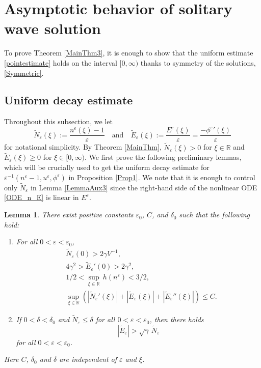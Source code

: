 \documentclass{amsart}
\newcommand{\veps}{\varepsilon}
\numberwithin{equation}{section}
\theoremstyle{plain}%
\newtheorem{lemma}[theorem]{Lemma}
\theoremstyle{definition}
\theoremstyle{remark}
\theoremstyle{remark}
\begin{document}
\section{Asymptotic behavior of solitary wave solution}
To prove Theorem \ref{MainThm3}, it is enough to show that the uniform estimate \eqref{pointestimate} holds on the interval $[0,\infty)$ thanks to symmetry of the solutions, \eqref{Symmetric}. 
\subsection{Uniform decay estimate}
Throughout this subsection, we let
\begin{equation}
\widetilde{N}_\veps(\xi):=\frac{n^\epsilon(\xi)-1}{\veps} \quad \text{and} \quad \widetilde{E}_\veps(\xi):=\frac{E^\veps(\xi)}{\veps}=\frac{-{\phi^\veps}'(\xi)}{\veps}
\end{equation}
for notational simplicity. By Theorem \ref{MainThm}, $\widetilde{N}_\veps(\xi)>0$ for $\xi\in\mathbb{R}$ and $\widetilde{E}_\veps(\xi)\geq 0$ for $\xi \in [0,\infty)$. We first prove the following preliminary lemmas,
which will be crucially used to get the uniform decay estimate for $\veps^{-1}(n^\veps-1,u^\veps,\phi^\veps)$ in Proposition \ref{Prop1}.
We note that it is enough to control only $\widetilde{N}_\veps$ in Lemma \ref{LemmaAux3}  since the right-hand side  of the nonlinear ODE \eqref{ODE_n_E} is linear in $E^\veps$. 
\begin{lemma}\label{LemmaAux1}
There exist positive constants $\veps_0$, $C$, and $\delta_0$ such that the following hold:
\begin{enumerate}
\item For all $0<\veps<\veps_0$, 
\begin{subequations}\label{secStatLem1}
\begin{align} 
& \widetilde{N}_\veps(0) > 2\gamma V^{-1}, \label{LowerboundofN} \\
& 4\gamma^2 > \widetilde{E}_\veps'(0) > 2\gamma^2 , \label{2ndDerivBdPhiat0} \\
& 1/2<\sup_{\xi \in \mathbb{R}}\, h(n^\veps)<3/2, \label{EqAppen4} \\
& \sup_{\xi\in \mathbb{R}}\left( |\widetilde{N}_\veps'(\xi)| + |\widetilde{E}_\veps(\xi)| +|\widetilde{E}_\veps''(\xi) | \right) \leq C. \label{1stDerivBdPhi}
\end{align}
\end{subequations}
\item If $0<\delta<\delta_0$ and $\widetilde{N}_\veps \leq \delta$ for all $0<\veps<\veps_0$, then there holds
\begin{equation}\label{Compatibility}
 |\widetilde{E}_\veps|> \sqrt{\gamma} \, \widetilde{N}_\veps
\end{equation}
for all $0<\veps<\veps_0$.
\end{enumerate}
Here $C$, $\delta_0$ and $\delta$ are independent of $\veps$ and $\xi$.
\end{lemma}
\end{document}

